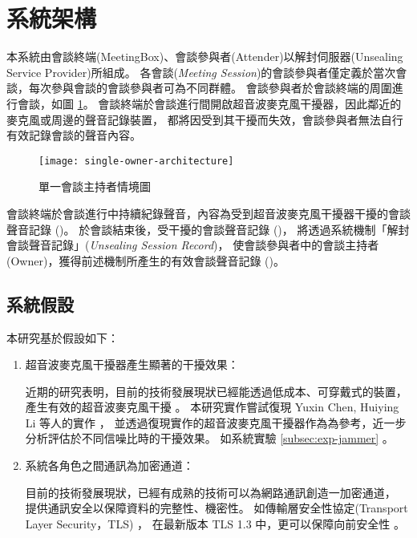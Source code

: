 \section{系統架構}

    本系統由會談終端(MeetingBox)、會談參與者(Attender)以解封伺服器(Unsealing Service Provider)所組成。
各會談({\it Meeting Session})的會談參與者僅定義於當次會談，每次參與會談的會談參與者可為不同群體。
會談參與者於會談終端的周圍進行會談，如圖 \ref{fig:s-o-arch}。
會談終端於會談進行間開啟超音波麥克風干擾器，因此鄰近的麥克風或周邊的聲音記錄裝置，
都將因受到其干擾而失效，會談參與者無法自行有效記錄會談的聲音內容。

\begin{figure}[H]
    \centering
    \texttt{[image: single-owner-architecture]}
    \caption{單一會談主持者情境圖}\label{fig:s-o-arch}
\end{figure}

    會談終端於會談進行中持續紀錄聲音，內容為受到超音波麥克風干擾器干擾的會談聲音記錄 (\DEFrecJ)。
於會談結束後，受干擾的會談聲音記錄 (\DEFrecJ)，
將透過系統機制「解封會談聲音記錄」({\it Unsealing Session Record})，
使會談參與者中的會談主持者(Owner)，獲得前述機制所產生的有效會談聲音記錄 (\DEFrecREV)。


\subsection{系統假設}

    本研究基於假設如下：

\begin{enumerate}
    \item 超音波麥克風干擾器產生顯著的干擾效果：

        近期的研究表明，目前的技術發展現狀已經能透過低成本、可穿戴式的裝置，
    產生有效的超音波麥克風干擾 \cite{chen2020demonstrating}。
    本研究實作嘗試復現 Yuxin Chen, Huiying Li 等人的實作 \cite{chen2020wearable}，
    並透過復現實作的超音波麥克風干擾器作為為參考，近一步分析評估於不同信噪比時的干擾效果。
    如系統實驗 \ref{subsec:exp-jammer} 。

    \item 系統各角色之間通訊為加密通道：

        目前的技術發展現狀，已經有成熟的技術可以為網路通訊創造一加密通道，
    提供通訊安全以保障資料的完整性、機密性。
    如傳輸層安全性協定(Transport Layer Security，TLS) \cite{rfc5246}，
    在最新版本 TLS 1.3 中，更可以保障向前安全性 \cite{rfc8446}。
\end{enumerate}


